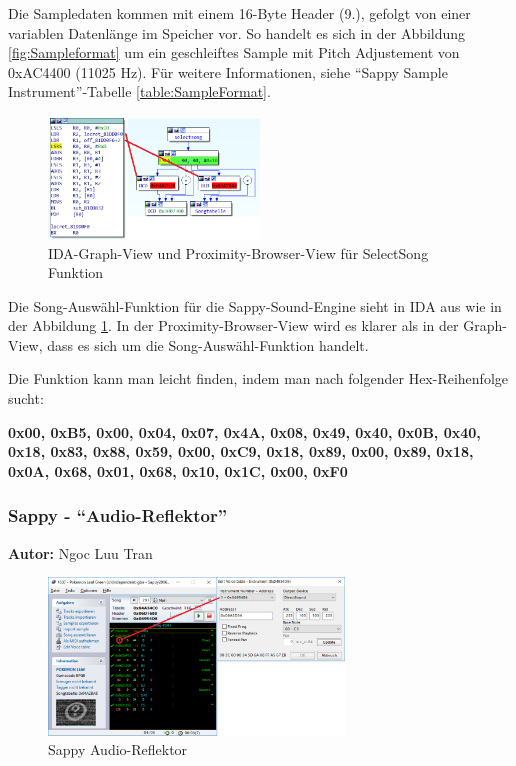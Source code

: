 \documentclass[11pt,a4paper]{scrartcl}
\newcommand{\AutorNgoc} {
    \vspace{-4mm}
    \large \textbf{Autor:} Ngoc Luu Tran \normalsize
    \vspace{2mm}
}
\begin{document}
Die Sampledaten kommen mit einem 16-Byte Header (9.), gefolgt von einer variablen Datenl\"ange im Speicher vor. So handelt es sich in der Abbildung \ref{fig:Sampleformat} um ein geschleiftes Sample mit Pitch Adjustement von 0xAC4400 (11025 Hz). F\"ur weitere Informationen, siehe \enquote{Sappy Sample Instrument}-Tabelle \ref{table:SampleFormat}.

\newpage
\begin{figure}[h]
    \centering
    \includegraphics[width=0.5\textwidth]{SelectSong}
	\caption{IDA-Graph-View und Proximity-Browser-View f\"ur SelectSong Funktion}
	\label{fig:SelectSong}
\end{figure}

Die Song-Ausw\"ahl-Funktion f\"ur die Sappy-Sound-Engine sieht in IDA aus wie in der Abbildung \ref{fig:SelectSong}. In der Proximity-Browser-View wird es klarer als in der Graph-View, dass es sich um die Song-Ausw\"ahl-Funktion handelt.

Die Funktion kann man leicht finden, indem man nach folgender Hex-Reihenfolge sucht:

\textbf{0x00, 0xB5, 0x00, 0x04, 0x07, 0x4A, 0x08, 0x49,
0x40, 0x0B, 0x40, 0x18, 0x83, 0x88, 0x59, 0x00,
0xC9, 0x18, 0x89, 0x00, 0x89, 0x18, 0x0A, 0x68,
0x01, 0x68, 0x10, 0x1C, 0x00, 0xF0}



\subsubsection{Sappy - \enquote{Audio-Reflektor}}
\AutorNgoc

\begin{figure}[h]
    \centering
    \includegraphics[width=0.7\textwidth]{Sappy}
    \caption{Sappy Audio-Reflektor}
    \label{fig:Sappy}
\end{figure}
\end{document}
